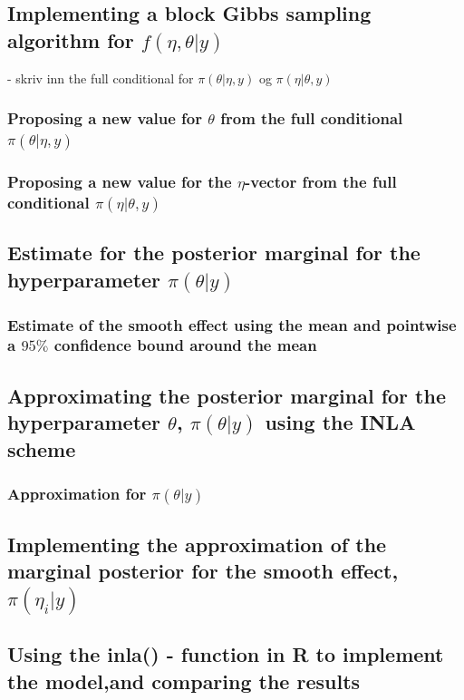 \subsection{Implementing a block Gibbs sampling algorithm for $f(\eta, \theta |y)$}

- skriv inn the full conditional for $\pi(\theta|\eta, y)$ og $\pi(\eta|\theta, y)$

\subsubsection{Proposing a new value for $\theta$ from the full conditional $\pi(\theta | \eta,y)$}

\subsubsection{Proposing a new value for the $\eta$-vector from the full conditional $\pi(\eta | \theta, y)$}

\subsection{Estimate for the posterior marginal for the hyperparameter $\pi(\theta|y)$}

\subsubsection{Estimate of the smooth effect using the mean and pointwise a $95 \%$ confidence bound around the mean}

\subsection{Approximating the posterior marginal for the hyperparameter $\theta$, $\pi(\theta|y)$ using the INLA scheme}

\subsubsection{Approximation for $\pi(\theta|y)$}

\subsection{Implementing the approximation of the marginal posterior for the smooth effect, $\pi(\eta_i | y)$}

\subsection{Using the inla() - function in R to implement the model,and comparing the results}

